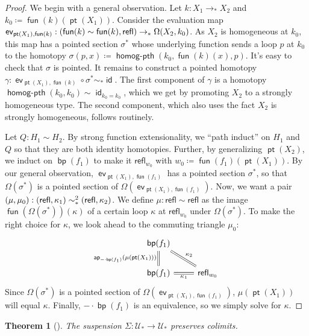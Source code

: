 \documentclass[10pt,a4paper]{article}
\newtheorem{thm}{Theorem}[section]
\theoremstyle{definition}
\theoremstyle{remark}
\newcommand{\U}{\mathcal{U}}
\newcommand{\refl}{\mathsf{refl}}
\newcommand{\0}{\mathbf{0}}
\newcommand{\1}{\mathbf{1}}
\newcommand{\2}{\mathbf{2}}
\DeclareMathOperator{\ap}{\mathsf{ap}}
\DeclareMathOperator{\homogpth}{\textsf{homog-pth}}
\DeclareMathOperator{\idd}{\mathsf{id}}
\DeclareMathOperator{\fun}{\mathsf{fun}}
\DeclareMathOperator{\bp}{\mathsf{bp}}
\DeclareMathOperator{\pt}{\mathsf{pt}}
\DeclareMathOperator{\ev}{\mathsf{ev}}
\newcommand{\myhref}[2]{%
  \href{#1}{\textcolor{blue!30!black}{#2}}%
}
\begin{document}
\begin{proof}
We begin with a general observation. Let $k : X_1 \to_{\ast} X_2$ and $k_0 \coloneqq \fun(k)(\pt(X_1))$. Consider the evaluation map $\ev_{\pt(X_1),\fun(k)} : \mleft(\fun(k) \sim \fun(k), \refl \mright) \to_{\ast} \Omega(X_2, k_0)$.  As $X_2$ is homogeneous at $k_0$, this map has a pointed section $\sigma^{\ast}$ whose underlying function sends a loop $p$ at $k_0$ to the homotopy $\sigma(p,x) \coloneqq \homogpth(k_0, \fun(k)(x), p)$. It's easy to check that $\sigma$ is pointed. It remains to construct a pointed homotopy $\gamma : \ev_{\pt(X_1),\fun(k)} \circ \sigma^{\ast} \sim_{\ast} \idd$.  
The first component of $\gamma$ is a homotopy $ \homogpth(k_0, k_0) \sim \idd_{k_0 = k_0}$, which we get by promoting $X_2$ to a strongly homogeneous type.  The second component, which also uses the fact $X_2$ is strongly homogeneous, follows routinely.
 
Let $Q : H_1 \sim H_2$. 
By strong function extensionality, we ``path induct'' on $H_1$ and $Q$ so that they are both identity homotopies. Further, by generalizing $\pt(X_2)$, we induct on $\bp(f_1)$ to make it $\refl_{w_0}$ with $w_0 \coloneqq \fun(f_1)(\pt(X_1))$. By our general observation, $\ev_{\pt(X_1), \fun(f_1)}$ has a pointed section $\sigma^{\ast}$, so that $\Omega(\sigma^{\ast})$ is a pointed section of $\Omega(\ev_{\pt(X_1), \fun(f_1)})$. Now, we want a pair $\mleft(\mu, \mu_0\mright) : \mleft(\refl, \kappa_1\mright) \sim_{\ast}^2 \mleft(\refl, \kappa_2\mright)$. We define $\mu : \refl \sim \refl$ as the image $\fun(\Omega(\sigma^{\ast}))(\kappa)$ of a certain loop $\kappa$ at $\refl_{w_0}$ under $\Omega(\sigma^{\ast})$. To make the right choice for $\kappa$, we look ahead to the commuting triangle $\mu_0$:
\[\begin{tikzcd}
	{\bp(f_1)} \\
	{\bp(f_1)} & {\refl_{w_0}}
	\arrow["{\ap_{{-} \cdot \bp(f_1)}(\mu (\pt(X_1)))}"', equals, from=1-1, to=2-1]
	\arrow["{\kappa_2}", equals, from=1-1, to=2-2]
	\arrow["{\kappa_1}"', equals, from=2-1, to=2-2]
\end{tikzcd}\] Since $\Omega(\sigma^{\ast})$ is a pointed section of $\Omega(\ev_{\pt(X_1), \fun(f_1)})$, $\mu (\pt(X_1))$ will equal $\kappa$. Finally, ${-} \cdot \bp(f_1)$ is an equivalence, so we simply solve for $\kappa$.
\end{proof}

\begin{thm}[{\cite[\myhref{https://github.com/PHart3/colimits-agda/blob/lapc-lmcs/HoTT-Agda/theorems/homotopy/Suspension/Susp-colim.agda}{Susp-colim}]{2cohagda-pub}}]\label{suspcol}
The suspension $\Sigma : \U_{\ast} \to \U_{\ast}$ preserves colimits.
\end{thm}
\end{document}
